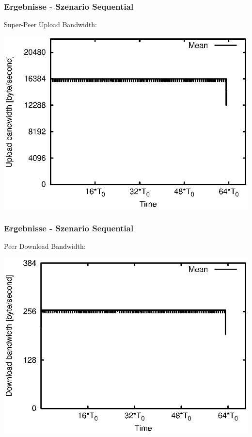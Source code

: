 \begin{frame}
  \frametitle{Ergebnisse - Szenario Sequential}
  Super-Peer Upload Bandwidth:
  
  \begin{center}
    \includegraphics[width=1\textwidth]{fig/plots/scenario_2_seq/plots/GeneratedMeanCurrentSuperSeederUploadBandwidth.csv.eps}
  \end{center}
\end{frame}

\begin{frame}
  \frametitle{Ergebnisse - Szenario Sequential}
  Peer Download Bandwidth:
  
  \begin{center}
    \includegraphics[width=1\textwidth]{fig/plots/scenario_2_seq/plots/GeneratedMeanCurrentDownloadBandwidth.csv.eps}
  \end{center}
\end{frame}


